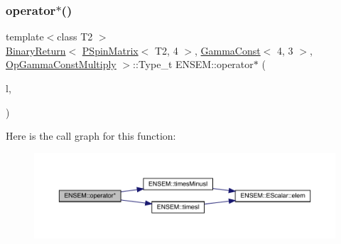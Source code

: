 \subsubsection{\texorpdfstring{operator$\ast$()}{operator*()}\hspace{0.1cm}{\footnotesize\ttfamily [20/64]}}
{\footnotesize\ttfamily template$<$class T2 $>$ \\
\mbox{\hyperlink{structENSEM_1_1BinaryReturn}{Binary\+Return}}$<$ \mbox{\hyperlink{classENSEM_1_1PSpinMatrix}{P\+Spin\+Matrix}}$<$ T2, 4 $>$, \mbox{\hyperlink{classENSEM_1_1GammaConst}{Gamma\+Const}}$<$ 4, 3 $>$, \mbox{\hyperlink{structENSEM_1_1OpGammaConstMultiply}{Op\+Gamma\+Const\+Multiply}} $>$\+::Type\+\_\+t E\+N\+S\+E\+M\+::operator$\ast$ (\begin{DoxyParamCaption}\item[{const \mbox{\hyperlink{classENSEM_1_1PSpinMatrix}{P\+Spin\+Matrix}}$<$ T2, 4 $>$ \&}]{l,  }\item[{const \mbox{\hyperlink{classENSEM_1_1GammaConst}{Gamma\+Const}}$<$ 4, 3 $>$ \&}]{ }\end{DoxyParamCaption})\hspace{0.3cm}{\ttfamily [inline]}}

Here is the call graph for this function\+:\nopagebreak
\begin{figure}[H]
\begin{center}
\leavevmode
\includegraphics[width=350pt]{d6/df5/group__primspinmatrix_ga4489f67258a145c07f7805077699ec24_cgraph}
\end{center}
\end{figure}
\mbox{\label{group__primspinmatrix_gafa880313515ac76955c6c4de7513add3}} 

